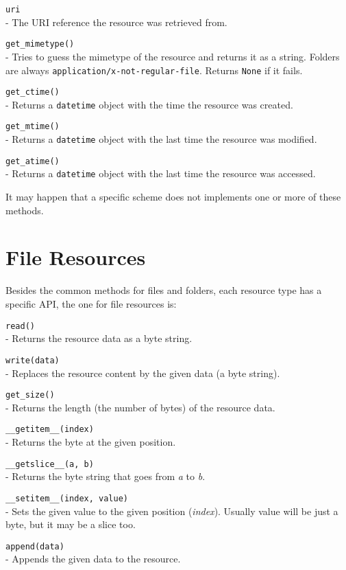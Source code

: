 \begin{api}
  {\tt uri}\\
  - The URI reference the resource was retrieved from.

  {\tt get\_mimetype()}\\
  - Tries to guess the mimetype of the resource and returns it as a string.
    Folders are always {\tt application/x-not-regular-file}. Returns {\tt None}
    if it fails.

  {\tt get\_ctime()}\\
  - Returns a {\tt datetime} object with the time the resource was created.

  {\tt get\_mtime()}\\
  - Returns a {\tt datetime} object with the last time the resource was
    modified.

  {\tt get\_atime()}\\
  - Returns a {\tt datetime} object with the last time the resource was
    accessed.
\end{api}

It may happen that a specific scheme does not implements one or more of
these methods.

\section{File Resources}

Besides the common methods for files and folders, each resource type has
a specific API, the one for file resources is:

\begin{api}
  {\tt read()}\\
  - Returns the resource data as a byte string.

  {\tt write(data)}\\
  - Replaces the resource content by the given data (a byte string).

  {\tt get\_size()}\\
  - Returns the length (the number of bytes) of the resource data.

  {\tt \_\_getitem\_\_(index)}\\
  - Returns the byte at the given position.

  {\tt \_\_getslice\_\_(a, b)}\\
  - Returns the byte string that goes from {\em a} to {\em b}.

  {\tt \_\_setitem\_\_(index, value)}\\
  - Sets the given value to the given position ({\em index}). Usually
    value will be just a byte, but it may be a slice too.

  {\tt append(data)}\\
  - Appends the given data to the resource.
\end{api}


